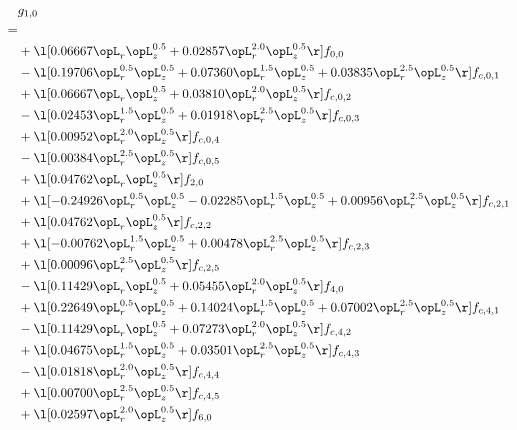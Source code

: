 \begin{alignat}{2} 
\label{eq:g_10_0} 
& g_{1,0} \nonumber \\ 
 = \\ 
& + \l[  0.06667 \opL_r \opL_z^{0.5} +  0.02857 \opL_r^{2.0} \opL_z^{0.5}  \r] f_{0,0} \nonumber \\ 
& - \l[  0.19706 \opL_r^{0.5} \opL_z^{0.5} +  0.07360 \opL_r^{1.5} \opL_z^{0.5} +  0.03835 \opL_r^{2.5} \opL_z^{0.5}  \r] f_{c,0,1} \nonumber \\ 
& + \l[  0.06667 \opL_r \opL_z^{0.5} +  0.03810 \opL_r^{2.0} \opL_z^{0.5}  \r] f_{c,0,2} \nonumber \\ 
& - \l[  0.02453 \opL_r^{1.5} \opL_z^{0.5} +  0.01918 \opL_r^{2.5} \opL_z^{0.5}  \r] f_{c,0,3} \nonumber \\ 
& + \l[  0.00952 \opL_r^{2.0} \opL_z^{0.5}  \r] f_{c,0,4} \nonumber \\ 
& - \l[  0.00384 \opL_r^{2.5} \opL_z^{0.5}  \r] f_{c,0,5} \nonumber \\ 
& + \l[  0.04762 \opL_r \opL_z^{0.5}  \r] f_{2,0} \nonumber \\ 
& + \l[  -0.24926 \opL_r^{0.5} \opL_z^{0.5}   -0.02285 \opL_r^{1.5} \opL_z^{0.5} +  0.00956 \opL_r^{2.5} \opL_z^{0.5}  \r] f_{c,2,1} \nonumber \\ 
& + \l[  0.04762 \opL_r \opL_z^{0.5}  \r] f_{c,2,2} \nonumber \\ 
& + \l[  -0.00762 \opL_r^{1.5} \opL_z^{0.5} +  0.00478 \opL_r^{2.5} \opL_z^{0.5}  \r] f_{c,2,3} \nonumber \\ 
& + \l[  0.00096 \opL_r^{2.5} \opL_z^{0.5}  \r] f_{c,2,5} \nonumber \\ 
& - \l[  0.11429 \opL_r \opL_z^{0.5} +  0.05455 \opL_r^{2.0} \opL_z^{0.5}  \r] f_{4,0} \nonumber \\ 
& + \l[  0.22649 \opL_r^{0.5} \opL_z^{0.5} +  0.14024 \opL_r^{1.5} \opL_z^{0.5} +  0.07002 \opL_r^{2.5} \opL_z^{0.5}  \r] f_{c,4,1} \nonumber \\ 
& - \l[  0.11429 \opL_r \opL_z^{0.5} +  0.07273 \opL_r^{2.0} \opL_z^{0.5}  \r] f_{c,4,2} \nonumber \\ 
& + \l[  0.04675 \opL_r^{1.5} \opL_z^{0.5} +  0.03501 \opL_r^{2.5} \opL_z^{0.5}  \r] f_{c,4,3} \nonumber \\ 
& - \l[  0.01818 \opL_r^{2.0} \opL_z^{0.5}  \r] f_{c,4,4} \nonumber \\ 
& + \l[  0.00700 \opL_r^{2.5} \opL_z^{0.5}  \r] f_{c,4,5} \nonumber \\ 
& + \l[  0.02597 \opL_r^{2.0} \opL_z^{0.5}  \r] f_{6,0} \nonumber \\ 

\end{alignat}
